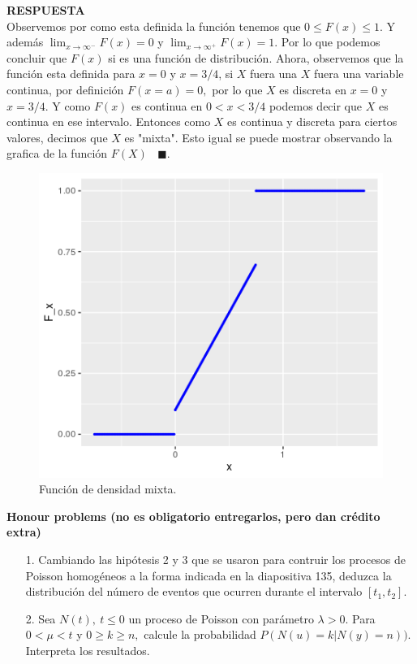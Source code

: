 \documentclass[11pt,letterpaper]{article}
\newcommand{\res}{\textbf{RESPUESTA}\\}
\newcommand{\finf}{\blacksquare.}
\begin{document}
\begin{itemize}
\res 
Observemos por como esta definida la función tenemos que $0\leq F(x) \leq 1$. Y además $\lim_{x\rightarrow\infty^-}F(x)=0$ y $\lim_{x\rightarrow\infty^+}F(x)=1$. Por lo que podemos concluir que $F(x)$ si es una función de distribución. Ahora, observemos que la función esta definida para $x=0$ y $x=3/4$, si $X$ fuera una $X$ fuera una variable continua, por definición $F(x=a)=0,$ por lo que $X$ es discreta en $x=0$ y $x=3/4$. Y como $F(x)$ es continua en $0<x<3/4$ podemos decir que $X$ es continua en ese intervalo. Entonces como $X$ es continua y discreta para ciertos valores, decimos que $X$ es "mixta". Esto igual se puede mostrar observando la grafica de la función $F(X) \ \ \ \ \finf$
\begin{figure}[H]
\centering
\includegraphics[scale=0.7]{ejercicio_9.png}
\caption{Función de densidad mixta.}
\end{figure}

\end{itemize}


\textbf{Honour problems (no es obligatorio entregarlos, pero dan crédito extra)}\\

\begin{itemize}
\item[1.] Cambiando las hipótesis 2 y 3 que se usaron para contruir los procesos de Poisson homogéneos
a la forma indicada en la diapositiva 135, deduzca la distribución del número de eventos que
ocurren durante el intervalo $[t_1 , t_2]$.

\item[2.] Sea $N(t), \ t\leq 0$ un proceso de Poisson con parámetro $\lambda >0$. Para $0<\mu <t$ y $0\geq k\geq n,$ calcule la probabilidad $P(N(u)=k|N(y)=n)).$ Interpreta los resultados.
\end{itemize}
\end{document}
